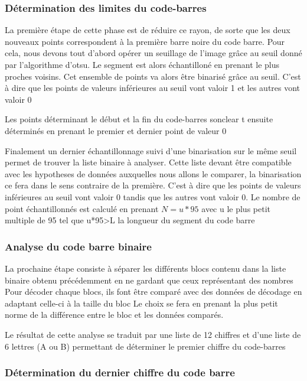 \documentclass{rapport}
\begin{document}
\subsubsection*{Détermination des limites du code-barres}
La première étape de cette phase est de réduire ce rayon, de sorte que les deux nouveaux points correspondent à la première barre noire du code barre.
Pour cela, nous devons tout d'abord opérer un seuillage de l'image grâce au seuil donné par l'algorithme d'otsu.
Le segment est alors échantilloné en prenant le plus proches voisins. 
Cet ensemble de points va alors être binarisé grâce au seuil. C'est à dire que les points de valeurs inférieures au seuil vont valoir 1 et les autres vont valoir 0

Les points déterminant le début et la fin du code-barres sonclear
t ensuite déterminés en prenant le premier et dernier point de valeur 0

Finalement un dernier échantillonnage suivi d'une binarisation sur le même seuil permet de trouver la liste binaire à analyser. Cette liste devant être compatible avec les hypotheses de données auxquelles nous allons le comparer, la binarisation ce fera dans le sens contraire de la première.
C'est à dire que les points de valeurs inférieures au seuil vont valoir 0 tandis que les autres vont valoir 0.
Le nombre de point échantillonnés est calculé en prenant $N=u*95$ avec u le plus petit multiple de 95 tel que u*95>L la longueur du segment du code barre

\subsubsection{Analyse du code barre binaire}
La prochaine étape consiste à séparer les différents blocs contenu dans la liste binaire obtenu précédemment en ne gardant que ceux représentant des nombres
Pour décoder chaque blocs, ils font être comparé avec des données de décodage en adaptant celle-ci à la taille du bloc 
Le choix se fera en prenant la plus petit norme de la différence entre le bloc et les données comparés.

Le résultat de cette analyse se traduit par une liste de 12 chiffres et d'une liste de 6 lettres (A ou B)
permettant de déterminer le premier chiffre du code-barres

\subsubsection*{Détermination du dernier chiffre du code barre}
\end{document}
